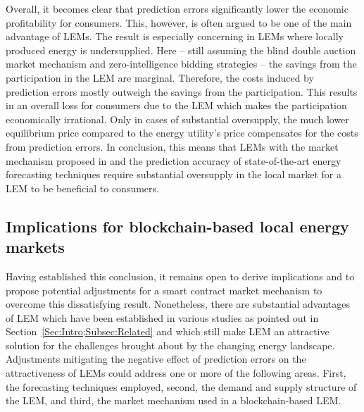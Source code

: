 Overall, it becomes clear that prediction errors significantly lower the economic profitability for consumers. This, however, is often argued to be one of the main advantage of LEMs. The result is especially concerning in LEMs where locally produced energy is undersupplied. Here -- still assuming the blind double auction market mechanism and zero-intelligence bidding strategies -- the savings from the participation in the LEM are marginal. Therefore, the costs induced by prediction errors mostly outweigh the savings from the participation. This results in an overall loss for consumers due to the LEM which makes the participation economically irrational. Only in cases of substantial oversupply, the much lower equilibrium price compared to the energy utility's price compensates for the costs from prediction errors. In conclusion, this means that LEMs with the market mechanism proposed in \citet{Mengelkamp:2018a} and the prediction accuracy of state-of-the-art energy forecasting techniques require substantial oversupply in the local market for a LEM to be beneficial to consumers.




\subsection{Implications for blockchain-based local energy markets}\label{Sec:Results;Subsec:Implications}

Having established this conclusion, it remains open to derive implications and to propose potential adjustments for a smart contract market mechanism to overcome this dissatisfying result. Nonetheless, there are substantial advantages of LEM which have been established in various studies as pointed out in Section~\ref{Sec:Intro;Subsec:Related} and which still make LEM an attractive solution for the challenges brought about by the changing energy landscape. Adjustments mitigating the negative effect of prediction errors on the attractiveness of LEMs could address one or more of the following areas. First, the forecasting techniques employed, second, the demand and supply structure of the LEM, and third, the market mechanism used in a blockchain-based LEM.

